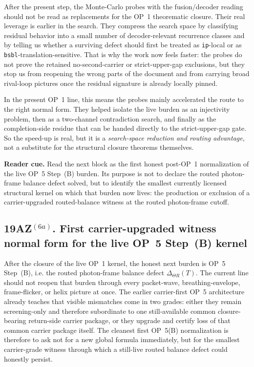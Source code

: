 \begin{remark}
\label{rem:completion-side-collapse-role-monte-carlo-probes}
After the present step, the Monte-Carlo probes with the fusion/decoder reading should not be read as replacements for the OP~1 theorematic closure. Their real leverage is earlier in the search. They compress the search space by classifying residual behavior into a small number of decoder-relevant recurrence classes and by telling us whether a surviving defect should first be treated as \texttt{ip}-local or as \texttt{bsbl}-translation-sensitive. That is why the work now feels faster: the probes do not prove the retained no-second-carrier or strict-upper-gap exclusions, but they stop us from reopening the wrong parts of the document and from carrying broad rival-loop pictures once the residual signature is already locally pinned.

In the present OP~1 line, this means the probes mainly accelerated the route to the right normal form. They helped isolate the live burden as an injectivity problem, then as a two-channel contradiction search, and finally as the completion-side residue that can be handed directly to the strict-upper-gap gate. So the speed-up is real, but it is a \emph{search-space reduction and routing advantage}, not a substitute for the structural closure theorems themselves.
\end{remark}



\noindent\textbf{Reader cue.} Read the next block as the first honest post-OP~1 normalization of the live OP~5 Step~(B) burden. Its purpose is not to declare the routed photon-frame balance defect solved, but to identify the smallest currently licensed structural kernel on which that burden now lives: the production or exclusion of a carrier-upgraded routed-balance witness at the routed photon-frame cutoff.

\subsection*{19AZ$^{(6a)}$. First carrier-upgraded witness normal form for the live OP~5 Step~(B) kernel}
\label{sec:first-carrier-upgraded-witness-normal-form-live-op5b-kernel}
After the closure of the live OP~1 kernel, the honest next burden is OP~5 Step~(B), i.e. the routed photon-frame balance defect \(\Delta_{\Theta R}(T)\). The current line should not reopen that burden through every packet-wave, breathing-envelope, frame-flicker, or helix picture at once. The earlier carrier-first OP~5 architecture already teaches that visible mismatches come in two grades: either they remain screening-only and therefore subordinate to one still-available common closure-bearing return-side carrier package, or they upgrade and certify loss of that common carrier package itself. The cleanest first OP~5(B) normalization is therefore to ask not for a new global formula immediately, but for the smallest carrier-grade witness through which a still-live routed balance defect could honestly persist.

